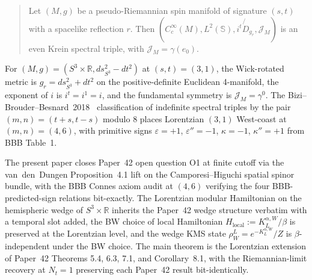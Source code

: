 \documentclass[11pt,a4paper]{article}
\theoremstyle{plain}
\theoremstyle{definition}
\newcommand{\Nt}{N_t}
\newcommand{\sthree}{S^{3}}
\newcommand{\R}{\mathbb{R}}
\newcommand{\KL}{K_{L}}
\begin{document}
\begin{quote}
Let $(M, g)$ be a pseudo-Riemannian spin manifold of signature
$(s, t)$ with a spacelike reflection $r$. Then
$(C^\infty_c(M), L^2(\mathbb{S}), i^t \not{\!\!D}_{g_r}, \mathcal{J}_M)$
is an even Krein spectral triple, with
$\mathcal{J}_M = \gamma(e_0)$.
\end{quote}

For $(M, g) = (\sthree \times \R, ds^2_{\sthree} - dt^2)$ at
$(s, t) = (3, 1)$, the Wick-rotated metric is
$g_r = ds^2_{\sthree} + dt^2$ on the positive-definite Euclidean
4-manifold, the exponent of $i$ is $i^t = i^1 = i$, and the
fundamental symmetry is $\mathcal{J}_M = \gamma^0$. The
Bizi--Brouder--Besnard~2018~\cite{bizi_brouder_besnard2018}
classification of indefinite spectral triples by the pair
$(m, n) = (t + s, t - s)$ modulo 8 places Lorentzian $(3, 1)$
West-coast at $(m, n) = (4, 6)$, with primitive signs
$\varepsilon = +1$, $\varepsilon'' = -1$, $\kappa = -1$,
$\kappa'' = +1$ from BBB Table~1.

The present paper closes Paper~42 open question O1 at finite cutoff
via the van~den~Dungen Proposition~4.1 lift on the Camporesi--Higuchi
spatial spinor bundle, with the BBB Connes axiom audit at $(4, 6)$
verifying the four BBB-predicted-sign relations bit-exactly. The
Lorentzian modular Hamiltonian on the hemispheric wedge of $\sthree
\times \R$ inherits the Paper~42 wedge structure verbatim with a
temporal slot added, the BW choice of local Hamiltonian
$H_{\mathrm{local}} := \KL^{\alpha, W} / \beta$ is preserved at the
Lorentzian level, and the wedge KMS state $\rho_W^L = e^{-\KL^{\alpha,
W}}/Z$ is $\beta$-independent under the BW choice. The main theorem is
the Lorentzian extension of Paper~42 Theorems 5.4, 6.3, 7.1, and
Corollary~8.1, with the Riemannian-limit recovery at $\Nt = 1$
preserving each Paper~42 result bit-identically.
\end{document}
